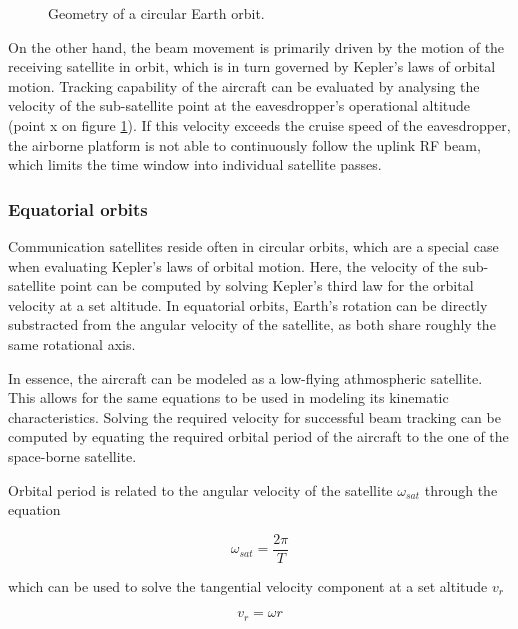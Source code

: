 \documentclass[english, 12pt, a4paper, elec, utf8, a-1b, online]{aaltothesis}
\begin{document}
\begin{figure}[h]
  \centering
  
  \caption{Geometry of a circular Earth orbit.}
  \label{fig-orbit-geometry}
\end{figure}

On the other hand, the beam movement is primarily driven by the motion of the receiving satellite in orbit, which is in turn governed by Kepler's laws of orbital motion.
Tracking capability of the aircraft can be evaluated by analysing the velocity of the sub-satellite point at the eavesdropper's operational altitude (point x on figure \ref{fig-orbit-geometry}).
If this velocity exceeds the cruise speed of the eavesdropper, the airborne platform is not able to continuously follow the uplink RF beam, which limits the time window into individual satellite passes.

\subsubsection{Equatorial orbits}

Communication satellites reside often in circular orbits, which are a special case when evaluating Kepler's laws of orbital motion.
Here, the velocity of the sub-satellite point can be computed by solving Kepler's third law for the orbital velocity at a set altitude.
In equatorial orbits, Earth's rotation can be directly substracted from the angular velocity of the satellite, as both share roughly the same rotational axis.

In essence, the aircraft can be modeled as a low-flying athmospheric satellite.
This allows for the same equations to be used in modeling its kinematic characteristics.
Solving the required velocity for successful beam tracking can be computed by equating the required orbital period of the aircraft to the one of the space-borne satellite.

Orbital period is related to the angular velocity of the satellite $\omega_{sat}$ through the equation

\begin{equation} \label{eq-ang-vel-1}
  \omega_{sat} = \frac{2\pi}{T}
\end{equation}

\noindent
which can be used to solve the tangential velocity component at a set altitude $v_r$

\begin{equation} \label{eq-ang-vel-2}
  v_r = \omega r
\end{equation}
\end{document}
